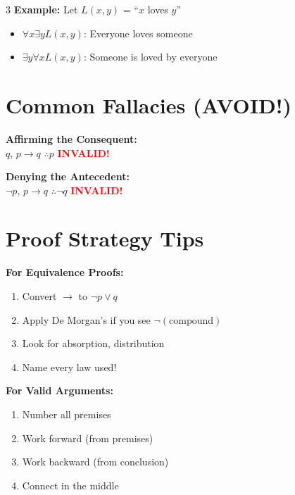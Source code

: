 \documentclass[10pt,landscape,a4paper]{article}
\newcommand{\tor}{\vee}
\newcommand{\tnot}{\neg}
\newcommand{\timplies}{\rightarrow}
\begin{document}
\begin{multicols}{3}
\textbf{Example:} Let $L(x,y)$ = ``$x$ loves $y$''
\begin{itemize}[nosep,leftmargin=*]
\item $\forall x \exists y L(x,y)$: Everyone loves someone
\item $\exists y \forall x L(x,y)$: Someone is loved by everyone
\end{itemize}

\section*{Common Fallacies (AVOID!)}

\textbf{Affirming the Consequent:}\\
$q$, $p \timplies q$ $\therefore p$ \quad \textcolor{red}{\textbf{INVALID!}}

\textbf{Denying the Antecedent:}\\
$\tnot p$, $p \timplies q$ $\therefore \tnot q$ \quad \textcolor{red}{\textbf{INVALID!}}

\section*{Proof Strategy Tips}

\textbf{For Equivalence Proofs:}
\begin{enumerate}[nosep,leftmargin=*]
\item Convert $\timplies$ to $\tnot p \tor q$
\item Apply De Morgan's if you see $\tnot(\text{compound})$
\item Look for absorption, distribution
\item Name every law used!
\end{enumerate}

\textbf{For Valid Arguments:}
\begin{enumerate}[nosep,leftmargin=*]
\item Number all premises
\item Work forward (from premises)
\item Work backward (from conclusion)
\item Connect in the middle
\end{enumerate}

\end{multicols}
\end{document}
